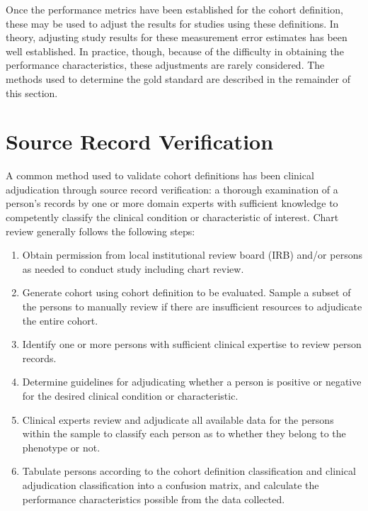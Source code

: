 \documentclass[
  letterpaper,
  paper=7in:10in,
  pagesize=pdftex,
  headinclude=on,
  footinclude=on,
  12pt]{scrbook}
\begin{document}
Once the performance metrics have been established for the cohort
definition, these may be used to adjust the results for studies using
these definitions. In theory, adjusting study results for these
measurement error estimates has been well established. In practice,
though, because of the difficulty in obtaining the performance
characteristics, these adjustments are rarely considered. The methods
used to determine the gold standard are described in the remainder of
this section.

\section{Source Record Verification}\label{source-record-verification}

A common method used to validate cohort definitions has been clinical
adjudication through source record verification: a thorough examination
of a person's records by one or more domain experts with sufficient
knowledge to competently classify the clinical condition or
characteristic of interest. Chart review generally follows the following
steps:

\begin{enumerate}
\def\labelenumi{\arabic{enumi}.}
\item
  Obtain permission from local institutional review board (IRB) and/or
  persons as needed to conduct study including chart review.
\item
  Generate cohort using cohort definition to be evaluated. Sample a
  subset of the persons to manually review if there are insufficient
  resources to adjudicate the entire cohort.
\item
  Identify one or more persons with sufficient clinical expertise to
  review person records.
\item
  Determine guidelines for adjudicating whether a person is positive or
  negative for the desired clinical condition or characteristic.
\item
  Clinical experts review and adjudicate all available data for the
  persons within the sample to classify each person as to whether they
  belong to the phenotype or not.
\item
  Tabulate persons according to the cohort definition classification and
  clinical adjudication classification into a confusion matrix, and
  calculate the performance characteristics possible from the data
  collected.
\end{enumerate}
\end{document}
